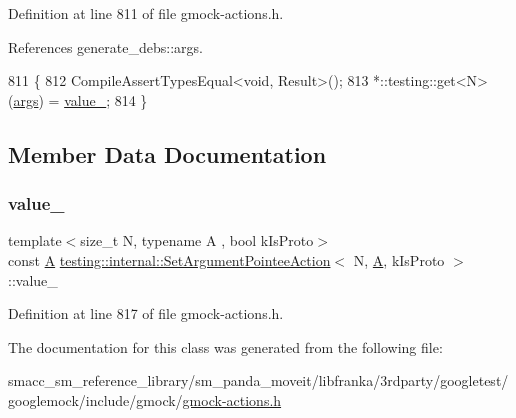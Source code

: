 Definition at line 811 of file gmock-\/actions.\+h.



References generate\+\_\+debs\+::args.


\begin{DoxyCode}
811                                                 \{
812     CompileAssertTypesEqual<void, Result>();
813     *::testing::get<N>(\hyperlink{namespacegenerate__debs_a75f9143e38df82d83b2e8a6f99cae02c}{args}) = \hyperlink{classtesting_1_1internal_1_1SetArgumentPointeeAction_a57dba59652a5ea603c5e12c72e195b13}{value\_};
814   \}
\end{DoxyCode}


\subsection{Member Data Documentation}
\mbox{\label{classtesting_1_1internal_1_1SetArgumentPointeeAction_a57dba59652a5ea603c5e12c72e195b13}} 
\subsubsection{\texorpdfstring{value\+\_\+}{value\_}}
{\footnotesize\ttfamily template$<$size\+\_\+t N, typename A , bool k\+Is\+Proto$>$ \\
const \hyperlink{namespacetesting_a5e9134d655d2fc9323902348083282e7}{A} \hyperlink{classtesting_1_1internal_1_1SetArgumentPointeeAction}{testing\+::internal\+::\+Set\+Argument\+Pointee\+Action}$<$ N, \hyperlink{namespacetesting_a5e9134d655d2fc9323902348083282e7}{A}, k\+Is\+Proto $>$\+::value\+\_\+\hspace{0.3cm}{\ttfamily [private]}}



Definition at line 817 of file gmock-\/actions.\+h.



The documentation for this class was generated from the following file\+:\begin{DoxyCompactItemize}
\item 
smacc\+\_\+sm\+\_\+reference\+\_\+library/sm\+\_\+panda\+\_\+moveit/libfranka/3rdparty/googletest/googlemock/include/gmock/\hyperlink{gmock-actions_8h}{gmock-\/actions.\+h}\end{DoxyCompactItemize}
